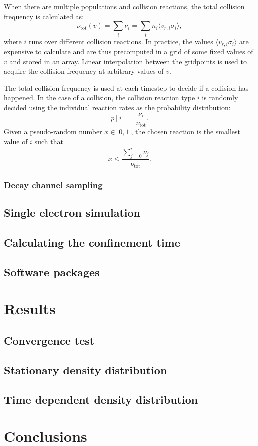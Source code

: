 \documentclass[a4paper,twoside,12pt]{article}
\begin{document}
When there are multiple populations and collision reactions, the total collision frequency is calculated as:
\begin{equation}
    \nu_\text{tot} (v) = \sum\limits_i \nu_i = \sum\limits_i n_i \langle v_{r, i} \sigma_i \rangle,
\end{equation}
where $i$ runs over different collision reactions.
In practice, the values $\langle v_{r, i} \sigma_i \rangle$ are expensive to calculate and are thus precomputed in a grid of some fixed values of $v$ and stored in an array. Linear interpolation between the gridpoints is used to acquire the collision frequency at arbitrary values of $v$.

The total collision frequency is used at each timestep to decide if a collision has happened. In the case of a collision, the collision reaction type $i$ is randomly decided using the individual reaction rates as the probability distribution:
\begin{equation}
    p[i] = \frac{\nu_i}{\nu_\text{tot}}.
\end{equation}
Given a pseudo-random number $x \in [0, 1[$, the chosen reaction is the smallest value of $i$ such that
\[
    x \leq \frac{\sum\limits_{j=0}^i \nu_j}{\nu_\text{tot}}.
\]

\subsubsection{Decay channel sampling}

\subsection{Single electron simulation}

\subsection{Calculating the confinement time}

\subsection{Software packages}

\section{Results}

\subsection{Convergence test}

\subsection{Stationary density distribution}

\subsection{Time dependent density distribution}

\section{Conclusions}

\clearpage



\end{document}
